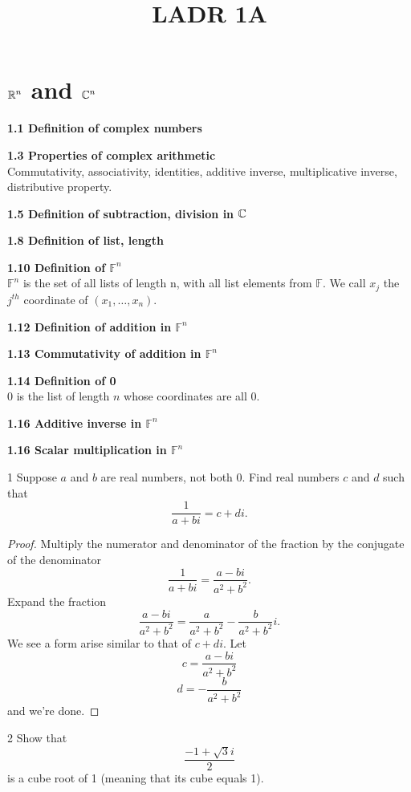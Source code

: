 \documentclass[12pt, letterpaper]{article}
\title{LADR 1A}
\begin{document}
\maketitle

\section*{$\mathbb{R}^n$ and $\mathbb{C}^n$}

\textbf{1.1 Definition of complex numbers}

\textbf{1.3 Properties of complex arithmetic}\\
Commutativity, associativity, identities, additive inverse, multiplicative inverse, distributive property.

\textbf{1.5 Definition of subtraction, division in $\mathbb{C}$}

\textbf{1.8 Definition of list, length}

\textbf{1.10 Definition of $\mathbb{F}^n$}\\
$\mathbb{F}^n$ is the set of all lists of length n, with all list elements from $\mathbb{F}$.
We call $x_j$ the $j^{th}$ coordinate of $(x_1,\ldots,x_n)$.

\textbf{1.12 Definition of addition in $\mathbb{F}^n$}

\textbf{1.13 Commutativity of addition in $\mathbb{F}^n$}

\textbf{1.14 Definition of 0}\\
0 is the list of length $n$ whose coordinates are all 0.

\textbf{1.16 Additive inverse in $\mathbb{F}^n$}

\textbf{1.16 Scalar multiplication in $\mathbb{F}^n$}


\begin{problem}{1}
Suppose $a$ and $b$ are real numbers, not both 0. Find real numbers $c$ and
$d$ such that
$${\frac{1}{a+bi}}=c+di.$$
\end{problem}

\begin{proof}
Multiply the numerator and denominator of the fraction by the conjugate of the denominator
$$\frac{1}{a+bi} = \frac{a-bi}{a^2+b^2}.$$
Expand the fraction
$$\frac{a-bi}{a^2+b^2} = \frac{a}{a^2+b^2} - \frac{b}{a^2+b^2}i.$$
We see a form arise similar to that of ${c+di}$. Let
$$c = \frac{a-bi}{a^2+b^2}$$
$$d = -\frac{b}{a^2+b^2}$$
and we're done.
\end{proof}

\begin{problem}{2}
Show that
$$\frac{-1+\sqrt{3}i}{2}$$
is a cube root of 1 (meaning that its cube equals 1).
\end{problem}
\end{document}
